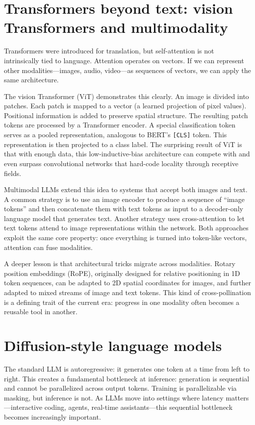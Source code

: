 \section{Transformers beyond text: vision Transformers and multimodality}
Transformers were introduced for translation, but self-attention is not intrinsically tied to language. Attention operates on vectors. If we can represent other modalities—images, audio, video—as sequences of vectors, we can apply the same architecture.

The vision Transformer (ViT) demonstrates this clearly. An image is divided into patches. Each patch is mapped to a vector (a learned projection of pixel values). Positional information is added to preserve spatial structure. The resulting patch tokens are processed by a Transformer encoder. A special classification token serves as a pooled representation, analogous to BERT’s \texttt{[CLS]} token. This representation is then projected to a class label. The surprising result of ViT is that with enough data, this low-inductive-bias architecture can compete with and even surpass convolutional networks that hard-code locality through receptive fields.

Multimodal LLMs extend this idea to systems that accept both images and text. A common strategy is to use an image encoder to produce a sequence of “image tokens” and then concatenate them with text tokens as input to a decoder-only language model that generates text. Another strategy uses cross-attention to let text tokens attend to image representations within the network. Both approaches exploit the same core property: once everything is turned into token-like vectors, attention can fuse modalities.

A deeper lesson is that architectural tricks migrate across modalities. Rotary position embeddings (RoPE), originally designed for relative positioning in 1D token sequences, can be adapted to 2D spatial coordinates for images, and further adapted to mixed streams of image and text tokens. This kind of cross-pollination is a defining trait of the current era: progress in one modality often becomes a reusable tool in another.

\section{Diffusion-style language models}
The standard LLM is autoregressive: it generates one token at a time from left to right. This creates a fundamental bottleneck at inference: generation is sequential and cannot be parallelized across output tokens. Training is parallelizable via masking, but inference is not. As LLMs move into settings where latency matters—interactive coding, agents, real-time assistants—this sequential bottleneck becomes increasingly important.

